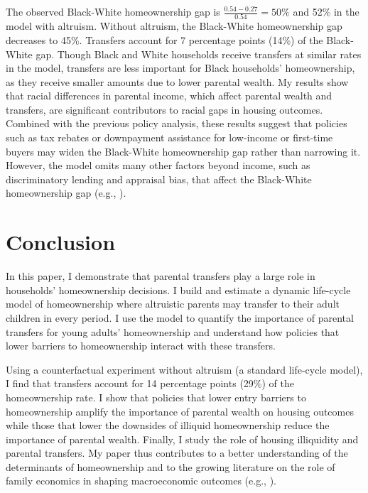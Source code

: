 \documentclass[12pt]{article}
\begin{document}
The observed Black-White homeownership gap is $\frac{0.54 - 0.27}{0.54}=50\%$ and 52\% in the model with altruism. Without altruism, the Black-White homeownership gap decreases to 45\%. Transfers account for 7 percentage points (14\%) of the Black-White gap. Though Black and White households receive transfers at similar rates in the model, transfers are less important for Black households’ homeownership, as they receive smaller amounts due to lower parental wealth. My results show that racial differences in parental income, which affect parental wealth and transfers, are significant contributors to racial gaps in housing outcomes. Combined with the previous policy analysis, these results suggest that policies such as tax rebates or downpayment assistance for low-income or first-time buyers may widen the Black-White homeownership gap rather than narrowing it. However, the model omits many other factors beyond income, such as discriminatory lending and appraisal bias, that affect the Black-White homeownership gap (e.g., \cite{shapiro2004hidden}).

\section{Conclusion}
In this paper, I demonstrate that parental transfers play a large role in households' homeownership decisions. I build and estimate a dynamic life-cycle model of homeownership where altruistic parents may transfer to their adult children in every period. I use the model to quantify the importance of parental transfers for young adults’ homeownership and understand how policies that lower barriers to homeownership interact with these transfers.

Using a counterfactual experiment without altruism (a standard life-cycle model), I find that transfers account for 14 percentage points (29\%) of the homeownership rate. I show that policies that lower entry barriers to homeownership amplify the importance of parental wealth on housing outcomes while those that lower the downsides of illiquid homeownership reduce the importance of parental wealth. Finally, I study the role of housing illiquidity and parental transfers. My paper thus contributes to a better understanding of the determinants of homeownership and to the growing literature on the role of family economics in shaping macroeconomic outcomes (e.g., \cite{Doepke2016a,Daruich2018}).
\end{document}
